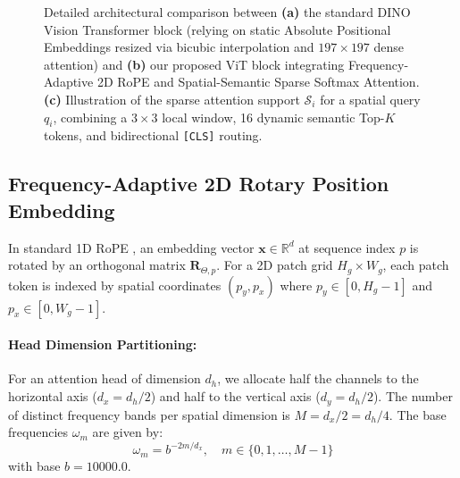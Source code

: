 \documentclass[11pt,a4paper]{article}
\begin{document}
\begin{figure}[t!]
{\begin{tikzpicture}
\end{tikzpicture}%
}
\caption{Detailed architectural comparison between \textbf{(a)} the standard DINO Vision Transformer block (relying on static Absolute Positional Embeddings resized via bicubic interpolation and $197\times 197$ dense attention) and \textbf{(b)} our proposed ViT block integrating Frequency-Adaptive 2D RoPE and Spatial-Semantic Sparse Softmax Attention. \textbf{(c)} Illustration of the sparse attention support $\mathcal{S}_i$ for a spatial query $q_i$, combining a $3\times 3$ local window, 16 dynamic semantic Top-$K$ tokens, and bidirectional \texttt{[CLS]} routing.}
\label{fig:architecture}
\end{figure}

\subsection{Frequency-Adaptive 2D Rotary Position Embedding}
\label{subsec:rope2d}

In standard 1D RoPE \cite{su2024roformer}, an embedding vector $\mathbf{x} \in \mathbb{R}^d$ at sequence index $p$ is rotated by an orthogonal matrix $\mathbf{R}_{\Theta, p}$. For a 2D patch grid $H_g \times W_g$, each patch token is indexed by spatial coordinates $(p_y, p_x)$ where $p_y \in [0, H_g-1]$ and $p_x \in [0, W_g-1]$.

\paragraph{Head Dimension Partitioning:} For an attention head of dimension $d_h$, we allocate half the channels to the horizontal axis ($d_x = d_h / 2$) and half to the vertical axis ($d_y = d_h / 2$). The number of distinct frequency bands per spatial dimension is $M = d_x / 2 = d_h / 4$. The base frequencies $\omega_m$ are given by:
\begin{equation}
\omega_m = b^{-2m / d_x}, \quad m \in \{0, 1, \dots, M-1\}
\label{eq:base_frequencies}
\end{equation}
with base $b = 10000.0$.
\end{document}
